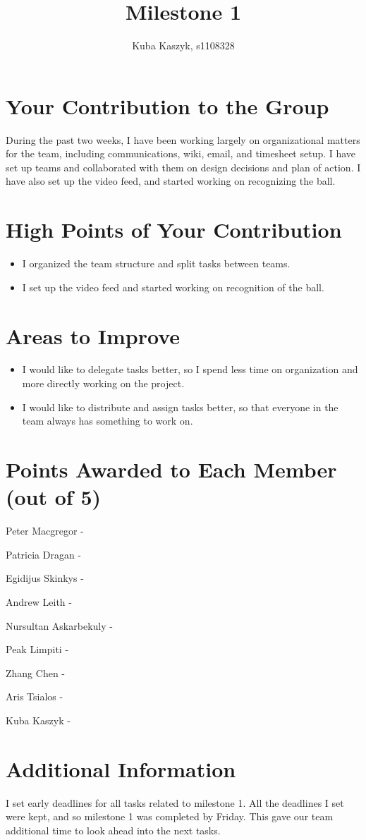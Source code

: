 \documentclass[dvips]{article}
\begin{document}
\sloppy
\title{Milestone 1}
 
\author{Kuba Kaszyk, s1108328}
 
\maketitle

\section{Your Contribution to the Group}
During the past two weeks, I have been working largely on organizational matters for the team, including communications, wiki, email, and timesheet setup. I have set up teams and collaborated with them on design decisions and plan of action. I have also set up the video feed, and started working on recognizing the ball.  

\section{High Points of Your Contribution}
\begin{itemize}
  \item I organized the team structure and split tasks between teams.
  \item I set up the video feed and started working on recognition of the ball.
\end{itemize} 

\section{Areas to Improve}
\begin{itemize}
  \item I would like to delegate tasks better, so I spend less time on organization and more directly working on the project.
  \item I would like to distribute and assign tasks better, so that everyone in the team always has something to work on. 
\end{itemize}


\section{Points Awarded to Each Member (out of 5)}
\begin{itemize}
\begin{multicols}{2}
\item Peter Macgregor - 
\item Patricia Dragan - 
\item Egidijus Skinkys - 
\item Andrew Leith - 
\item Nursultan Askarbekuly - 
\item Peak Limpiti - 
\item Zhang Chen - 
\item Aris Tsialos - 
\item Kuba Kaszyk - 
\end{multicols}
\end{itemize}

\section{Additional Information}
I set early deadlines for all tasks related to milestone 1. All the deadlines I set were kept, and so milestone 1 was completed by Friday. This gave our team additional time to look ahead into the next tasks.
\end{document}
